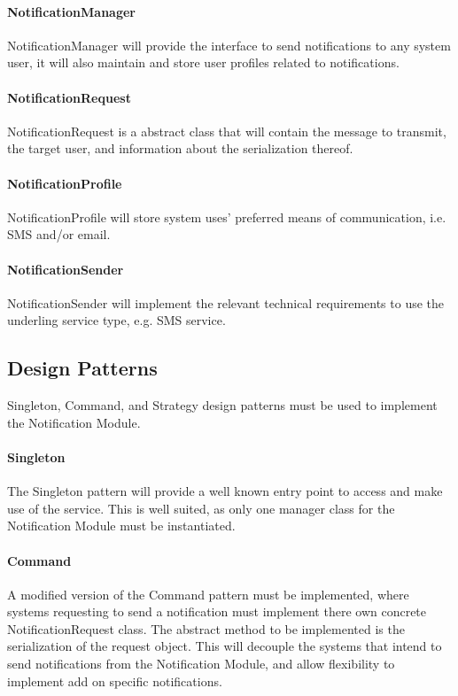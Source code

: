 \paragraph{NotificationManager}
NotificationManager will provide the interface to send notifications to any system user, it will also maintain and store user profiles related to notifications.

\paragraph{NotificationRequest}
NotificationRequest is a abstract class that will contain the message to transmit, the target user, and information about the serialization thereof.

\paragraph{NotificationProfile}
NotificationProfile will store system uses' preferred means of communication, i.e. SMS and/or email.

\paragraph{NotificationSender}
NotificationSender will implement the relevant technical requirements to use the underling service type, e.g. SMS service.

\subsection{Design Patterns}
Singleton, Command, and Strategy design patterns must be used to implement the Notification Module.

\paragraph{Singleton}
The Singleton pattern will provide a well known entry point to access and make use of the service. This is well suited, as only one manager class for the Notification Module must be instantiated. 

\paragraph{Command}
A modified version of the Command pattern must be implemented, where systems requesting to send a notification must implement there own concrete NotificationRequest class. The abstract method to be implemented is the serialization of the request object. This will decouple the systems that intend to send notifications from the Notification Module, and allow flexibility to implement add on specific notifications.

